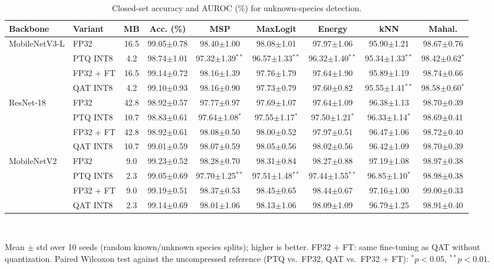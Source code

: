 \begin{table}[t]
\centering
\caption{Closed-set accuracy and AUROC (\%) for unknown-species detection.}
\label{tab:auroc}
\setlength{\tabcolsep}{3.5pt}
\footnotesize
\begin{tabular}{llccccccc}
\toprule
Backbone & Variant & MB & Acc. (\%) & MSP & MaxLogit & Energy & kNN & Mahal. \\
\midrule
MobileNetV3-L & FP32 & 16.5 & 99.05$\pm$0.78 & 98.40$\pm$1.00 & 98.08$\pm$1.01 & 97.97$\pm$1.06 & 95.90$\pm$1.21 & 98.67$\pm$0.76 \\
 & PTQ INT8 & 4.2 & 98.74$\pm$1.01 & 97.32$\pm$1.39$^{**}$ & 96.57$\pm$1.33$^{**}$ & 96.32$\pm$1.40$^{**}$ & 95.34$\pm$1.33$^{**}$ & 98.42$\pm$0.62$^{*}$ \\
 & FP32 + FT & 16.5 & 99.14$\pm$0.72 & 98.16$\pm$1.39 & 97.76$\pm$1.79 & 97.64$\pm$1.90 & 95.89$\pm$1.19 & 98.74$\pm$0.66 \\
 & QAT INT8 & 4.2 & 99.10$\pm$0.93 & 98.16$\pm$0.90 & 97.73$\pm$0.79 & 97.60$\pm$0.82 & 95.55$\pm$1.41$^{**}$ & 98.58$\pm$0.60$^{*}$ \\
\midrule
ResNet-18 & FP32 & 42.8 & 98.92$\pm$0.57 & 97.77$\pm$0.97 & 97.69$\pm$1.07 & 97.64$\pm$1.09 & 96.38$\pm$1.13 & 98.70$\pm$0.39 \\
 & PTQ INT8 & 10.7 & 98.83$\pm$0.61 & 97.64$\pm$1.08$^{*}$ & 97.55$\pm$1.17$^{*}$ & 97.50$\pm$1.21$^{*}$ & 96.33$\pm$1.14$^{*}$ & 98.69$\pm$0.41 \\
 & FP32 + FT & 42.8 & 98.92$\pm$0.61 & 98.08$\pm$0.50 & 98.00$\pm$0.52 & 97.97$\pm$0.51 & 96.47$\pm$1.06 & 98.72$\pm$0.40 \\
 & QAT INT8 & 10.7 & 99.01$\pm$0.59 & 98.07$\pm$0.59 & 98.05$\pm$0.56 & 98.02$\pm$0.56 & 96.42$\pm$1.09 & 98.70$\pm$0.39 \\
\midrule
MobileNetV2 & FP32 & 9.0 & 99.23$\pm$0.52 & 98.28$\pm$0.70 & 98.31$\pm$0.84 & 98.27$\pm$0.88 & 97.19$\pm$1.08 & 98.97$\pm$0.38 \\
 & PTQ INT8 & 2.3 & 99.05$\pm$0.69 & 97.70$\pm$1.25$^{**}$ & 97.51$\pm$1.48$^{**}$ & 97.44$\pm$1.55$^{**}$ & 96.85$\pm$1.10$^{*}$ & 98.98$\pm$0.38 \\
 & FP32 + FT & 9.0 & 99.19$\pm$0.51 & 98.37$\pm$0.53 & 98.45$\pm$0.65 & 98.44$\pm$0.67 & 97.16$\pm$1.00 & 99.00$\pm$0.33 \\
 & QAT INT8 & 2.3 & 99.14$\pm$0.69 & 98.01$\pm$1.06 & 98.13$\pm$1.06 & 98.09$\pm$1.09 & 96.79$\pm$1.25 & 98.91$\pm$0.40 \\
\bottomrule
\end{tabular}
\\[2pt]\parbox{\linewidth}{\scriptsize Mean $\pm$ std over 10 seeds (random known/unknown species splits); higher is better. FP32 + FT: same fine-tuning as QAT without quantization. Paired Wilcoxon test against the uncompressed reference (PTQ vs.\ FP32, QAT vs.\ FP32 + FT): $^{*}p<0.05$, $^{**}p<0.01$.}
\end{table}